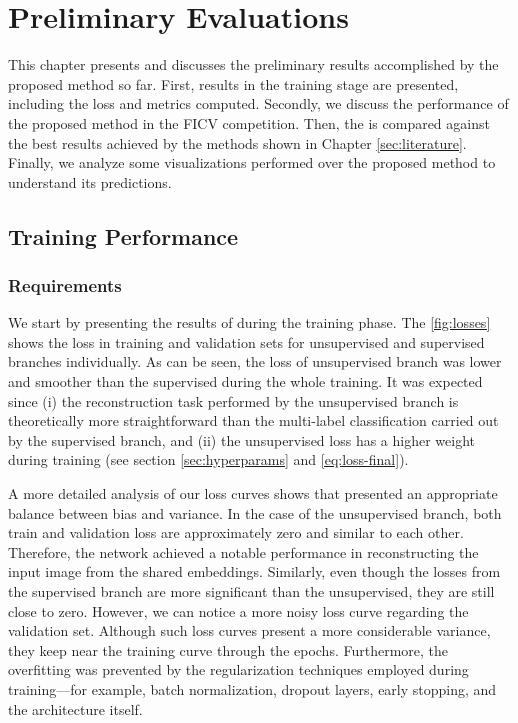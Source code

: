 \section{Preliminary Evaluations} \label{sec:results}

This chapter presents and discusses the preliminary results accomplished by the proposed method so far. First, \methodname results in the training stage are presented, including the loss and metrics computed. Secondly, we discuss the performance of the proposed method in the FICV competition. Then, the \methodname is compared against the best results achieved by the methods shown in Chapter \ref{sec:literature}. Finally, we analyze some visualizations performed over the proposed method to understand its predictions.

\subsection{Training Performance}

\subsubsection{Requirements}

We start by presenting the results of \methodname during the training phase. The \autoref{fig:losses} shows the loss in training and validation sets for unsupervised and supervised branches individually. As can be seen, the loss of unsupervised branch was lower and smoother than the supervised during the whole training. It was expected since (i) the reconstruction task performed by the unsupervised branch is theoretically more straightforward than the multi-label classification carried out by the supervised branch, and (ii) the unsupervised loss has a higher weight during training (see section \ref{sec:hyperparams} and \autoref{eq:loss-final}). 

A more detailed analysis of our loss curves shows that \methodname presented an appropriate balance between bias and variance. In the case of the unsupervised branch, both train and validation loss are approximately zero and similar to each other. Therefore, the network achieved a notable performance in reconstructing the input image from the shared embeddings. Similarly, even though the losses from the supervised branch are more significant than the unsupervised, they are still close to zero. However, we can notice a more noisy loss curve regarding the validation set. Although such loss curves present a more considerable variance, they keep near the training curve through the epochs. Furthermore, the overfitting was prevented by the regularization techniques employed during training—for example, batch normalization, dropout layers, early stopping, and the architecture itself.

